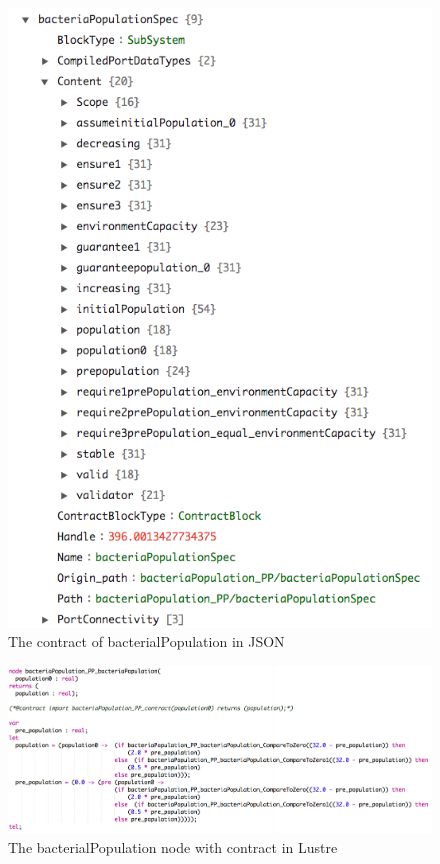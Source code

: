 \documentclass{article}
\begin{document}
\begin{figure}[h]
\begin{center}
  \includegraphics[scale=0.4]{figures/jsoncontractdef}    
\end{center}  
  \caption{The contract of bacterialPopulation in JSON}
  \label{jsoncontractdef}
\end{figure}

\begin{figure}[h]
\begin{center}
  \includegraphics[scale=0.3]{figures/lusnodecon}    
\end{center}  
  \caption{The bacterialPopulation node with contract in Lustre}
  \label{lusnodecon}
\end{figure}
\end{document}
